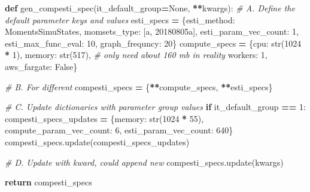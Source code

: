 \documentclass[
]{book}
\newenvironment{Shaded}{\begin{snugshade}}{\end{snugshade}}
\newcommand{\BuiltInTok}[1]{#1}
\newcommand{\CommentTok}[1]{\textcolor[rgb]{0.56,0.35,0.01}{\textit{#1}}}
\newcommand{\ControlFlowTok}[1]{\textcolor[rgb]{0.13,0.29,0.53}{\textbf{#1}}}
\newcommand{\DecValTok}[1]{\textcolor[rgb]{0.00,0.00,0.81}{#1}}
\newcommand{\KeywordTok}[1]{\textcolor[rgb]{0.13,0.29,0.53}{\textbf{#1}}}
\newcommand{\NormalTok}[1]{#1}
\newcommand{\OperatorTok}[1]{\textcolor[rgb]{0.81,0.36,0.00}{\textbf{#1}}}
\newcommand{\StringTok}[1]{\textcolor[rgb]{0.31,0.60,0.02}{#1}}
\newcommand{\VariableTok}[1]{\textcolor[rgb]{0.00,0.00,0.00}{#1}}
\begin{document}
\begin{Shaded}
\begin{Highlighting}[]
\KeywordTok{def}\NormalTok{ gen\_compesti\_spec(it\_default\_group}\OperatorTok{=}\VariableTok{None}\NormalTok{, }\OperatorTok{**}\NormalTok{kwargs):}
    \CommentTok{\# A. Define the default parameter keys and values}
\NormalTok{    esti\_specs }\OperatorTok{=}\NormalTok{ \{}\StringTok{\textquotesingle{}esti\_method\textquotesingle{}}\NormalTok{: }\StringTok{\textquotesingle{}MomentsSimuStates\textquotesingle{}}\NormalTok{,}
                  \StringTok{\textquotesingle{}momsets\_type\textquotesingle{}}\NormalTok{: [}\StringTok{\textquotesingle{}a\textquotesingle{}}\NormalTok{, }\StringTok{\textquotesingle{}20180805a\textquotesingle{}}\NormalTok{],}
                  \StringTok{\textquotesingle{}esti\_param\_vec\_count\textquotesingle{}}\NormalTok{: }\DecValTok{1}\NormalTok{,}
                  \StringTok{\textquotesingle{}esti\_max\_func\_eval\textquotesingle{}}\NormalTok{: }\DecValTok{10}\NormalTok{,}
                  \StringTok{\textquotesingle{}graph\_frequncy\textquotesingle{}}\NormalTok{: }\DecValTok{20}\NormalTok{\}}
\NormalTok{    compute\_specs }\OperatorTok{=}\NormalTok{ \{}\StringTok{\textquotesingle{}cpu\textquotesingle{}}\NormalTok{: }\BuiltInTok{str}\NormalTok{(}\DecValTok{1024} \OperatorTok{*} \DecValTok{1}\NormalTok{),}
                     \StringTok{\textquotesingle{}memory\textquotesingle{}}\NormalTok{: }\BuiltInTok{str}\NormalTok{(}\DecValTok{517}\NormalTok{),  }\CommentTok{\# only need about 160 mb in reality}
                     \StringTok{\textquotesingle{}workers\textquotesingle{}}\NormalTok{: }\DecValTok{1}\NormalTok{,}
                     \StringTok{\textquotesingle{}aws\_fargate\textquotesingle{}}\NormalTok{: }\VariableTok{False}\NormalTok{\}}

    \CommentTok{\# B. For different}
\NormalTok{    compesti\_specs }\OperatorTok{=}\NormalTok{ \{}\OperatorTok{**}\NormalTok{compute\_specs, }\OperatorTok{**}\NormalTok{esti\_specs\}}

    \CommentTok{\# C. Update dictionaries with parameter group values}
    \ControlFlowTok{if}\NormalTok{ it\_default\_group }\OperatorTok{==} \DecValTok{1}\NormalTok{:}
\NormalTok{        compesti\_specs\_updates }\OperatorTok{=}\NormalTok{ \{}\StringTok{\textquotesingle{}memory\textquotesingle{}}\NormalTok{: }\BuiltInTok{str}\NormalTok{(}\DecValTok{1024} \OperatorTok{*} \DecValTok{55}\NormalTok{),}
                                  \StringTok{\textquotesingle{}compute\_param\_vec\_count\textquotesingle{}}\NormalTok{: }\DecValTok{6}\NormalTok{,}
                                  \StringTok{\textquotesingle{}esti\_param\_vec\_count\textquotesingle{}}\NormalTok{: }\DecValTok{640}\NormalTok{\}}
\NormalTok{        compesti\_specs.update(compesti\_specs\_updates)}

    \CommentTok{\# D. Update with kward, could append new}
\NormalTok{    compesti\_specs.update(kwargs)}

    \ControlFlowTok{return}\NormalTok{ compesti\_specs}
\end{Highlighting}
\end{Shaded}
\end{document}
